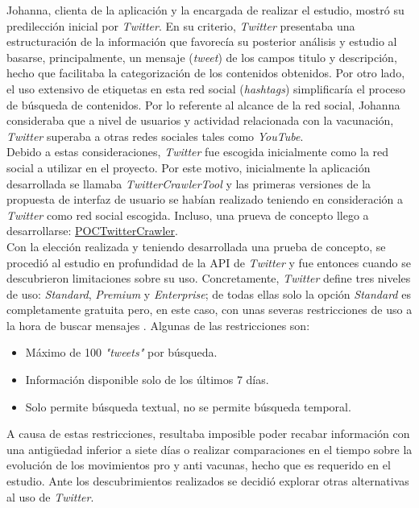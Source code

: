 \documentclass[11pt,a4paper]{article}
\begin{document}
Johanna, clienta de la aplicación y la encargada de realizar el estudio, mostró su predilección inicial por \textit{Twitter}. En su criterio, \textit{Twitter} presentaba una estructuración de la información que favorecía su posterior análisis y estudio al basarse, principalmente, un mensaje (\textit{tweet}) de los campos titulo y descripción, hecho que facilitaba la categorización de los contenidos obtenidos. Por otro lado, el uso extensivo de etiquetas en esta red social (\textit{hashtags}) simplificaría el proceso de búsqueda de contenidos. Por lo referente al alcance de la red social, Johanna consideraba que a nivel de usuarios y actividad relacionada con la vacunación, \textit{Twitter} superaba a otras redes sociales tales como \textit{YouTube}.
\\

Debido a estas consideraciones, \textit{Twitter} fue escogida inicialmente como la red social a utilizar en el proyecto. Por este motivo, inicialmente la aplicación desarrollada se llamaba \textit{TwitterCrawlerTool} y las primeras versiones de la propuesta de interfaz de usuario se habían realizado teniendo en consideración a \textit{Twitter} como red social escogida. Incluso, una prueva de concepto llego a desarrollarse: \href{https://github.com/jsanchezmend/TFGAntivacunas/tree/master/POCTwitterCrawler}{POCTwitterCrawler}.
\\

Con la elección realizada y teniendo desarrollada una prueba de concepto, se procedió al estudio en profundidad de la API de \textit{Twitter} y fue entonces cuando se descubrieron limitaciones sobre su uso. Concretamente, \textit{Twitter} define tres niveles de uso: \textit{Standard}, \textit{Premium} y \textit{Enterprise}; de todas ellas solo la opción \textit{Standard} es completamente gratuita pero, en este caso, con unas severas restricciones de uso a la hora de buscar mensajes \cite{17}. Algunas de las restricciones son:
\begin{itemize}
\item Máximo de 100 \textit{"tweets"} por búsqueda.
\item Información disponible solo de los últimos 7 días.
\item Solo permite búsqueda textual, no se permite búsqueda temporal.
\end{itemize}

A causa de estas restricciones, resultaba imposible poder recabar información con una antigüedad inferior a siete días o realizar comparaciones en el tiempo sobre la evolución de los movimientos pro y anti vacunas, hecho que es requerido en el estudio. Ante los descubrimientos realizados se decidió explorar otras alternativas al uso de \textit{Twitter}.
\\
\end{document}
